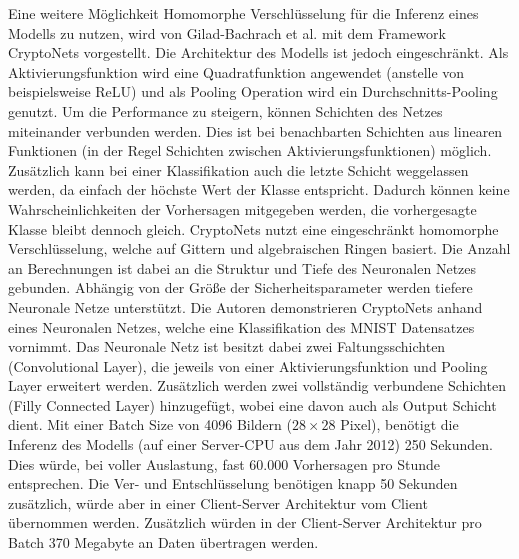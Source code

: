 Eine weitere Möglichkeit Homomorphe Verschlüsselung für die Inferenz eines Modells zu nutzen, wird von Gilad-Bachrach et al. mit dem Framework CryptoNets \cite{P-54} vorgestellt.
Die Architektur des Modells ist jedoch eingeschränkt. 
Als Aktivierungsfunktion wird eine Quadratfunktion angewendet (anstelle von beispielsweise ReLU) und als Pooling Operation wird ein Durchschnitts-Pooling genutzt.
Um die Performance zu steigern, können Schichten des Netzes miteinander verbunden werden. 
Dies ist bei benachbarten Schichten aus linearen Funktionen (in der Regel Schichten zwischen Aktivierungsfunktionen) möglich.
Zusätzlich kann bei einer Klassifikation auch die letzte Schicht weggelassen werden, da einfach der höchste Wert der Klasse entspricht. 
Dadurch können keine Wahrscheinlichkeiten der Vorhersagen mitgegeben werden, die vorhergesagte Klasse bleibt dennoch gleich.
CryptoNets nutzt eine eingeschränkt homomorphe Verschlüsselung, welche auf Gittern und algebraischen Ringen basiert. 
Die Anzahl an Berechnungen ist dabei an die Struktur und Tiefe des Neuronalen Netzes gebunden.
Abhängig von der Größe der Sicherheitsparameter werden tiefere Neuronale Netze unterstützt.
Die Autoren demonstrieren CryptoNets anhand eines Neuronalen Netzes, welche eine Klassifikation des MNIST Datensatzes \cite{D-MNIST} vornimmt.
Das Neuronale Netz ist besitzt dabei zwei Faltungsschichten (Convolutional Layer), die jeweils von einer Aktivierungsfunktion und Pooling Layer erweitert werden.
Zusätzlich werden zwei vollständig verbundene Schichten (Filly Connected Layer) hinzugefügt, wobei eine davon auch als Output Schicht dient.
Mit einer Batch Size von 4096 Bildern ($28 \times 28$ Pixel), benötigt die Inferenz des Modells (auf einer Server-CPU aus dem Jahr 2012) 250 Sekunden. 
Dies würde, bei voller Auslastung, fast 60.000 Vorhersagen pro Stunde entsprechen.
Die Ver- und Entschlüsselung benötigen knapp 50 Sekunden zusätzlich, würde aber in einer Client-Server Architektur vom Client übernommen werden.
Zusätzlich würden in der Client-Server Architektur pro Batch 370 Megabyte an Daten übertragen werden.

